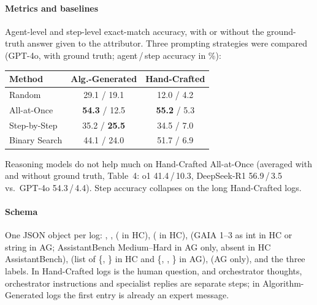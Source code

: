\paragraph{Metrics and baselines} Agent-level and step-level exact-match accuracy, with or without the ground-truth answer given to the attributor. Three prompting strategies were compared (GPT-4o, with ground truth; agent\,/\,step accuracy in \%):

\begin{center}\small
\begin{tabular}{@{}lcc@{}}\toprule
Method & Alg.-Generated & Hand-Crafted\\\midrule
Random & 29.1 / 19.1 & 12.0 / 4.2\\
All-at-Once & \textbf{54.3} / 12.5 & \textbf{55.2} / 5.3\\
Step-by-Step & 35.2 / \textbf{25.5} & 34.5 / 7.0\\
Binary Search & 44.1 / 24.0 & 51.7 / 6.9\\\bottomrule
\end{tabular}
\end{center}
Reasoning models do not help much on Hand-Crafted All-at-Once (averaged with and without ground truth, Table~4: o1 41.4\,/\,10.3, DeepSeek-R1 56.9\,/\,3.5 vs.\ GPT-4o 54.3\,/\,4.4). Step accuracy collapses on the long Hand-Crafted logs.

\paragraph{Schema} One JSON object per log: , ,  ( in HC),  ( in HC),  (GAIA 1--3 as int in HC or string in AG; AssistantBench Medium--Hard in AG only, absent in HC AssistantBench),  (list of \{, \} in HC and \{, , \} in AG),  (AG only), and the three labels. In Hand-Crafted logs  is the human question, and orchestrator thoughts, orchestrator instructions and specialist replies are separate steps; in Algorithm-Generated logs the first entry is already an expert message.


